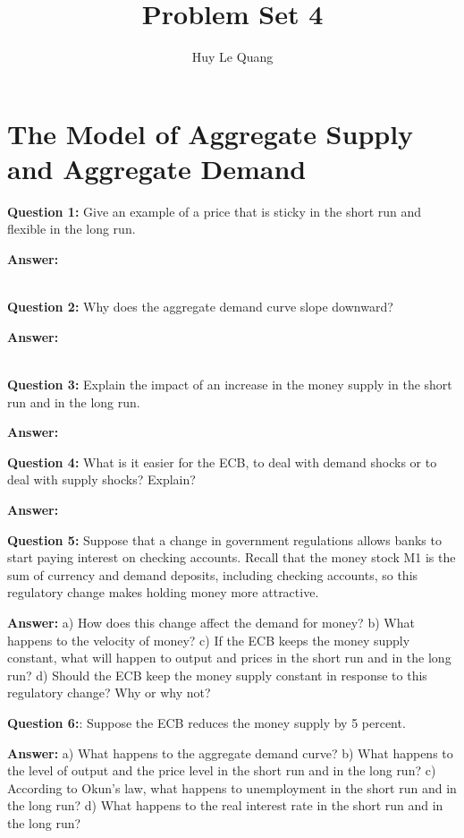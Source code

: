 \documentclass[a4paper, 11pt]{article}
\title{Problem Set 4}
\author{Huy Le Quang}
\begin{document}
\maketitle

\section {The Model of Aggregate Supply and Aggregate Demand}

\textbf{Question 1:} Give an example of a price that is sticky in the short run and flexible in the long run.

\textbf{Answer:} 

 \\

\textbf{Question 2:} Why does the aggregate demand curve slope downward?

\textbf{Answer:} 

 \\

\textbf{Question 3:} Explain the impact of an increase in the money supply in the short run and in the long run.

\textbf{Answer:}




\textbf{Question 4:} What is it easier for the ECB, to deal with demand shocks or to deal with supply shocks? Explain?

\textbf{Answer:}



\textbf{Question 5:} Suppose that a change in government regulations allows banks to start paying interest on checking accounts. Recall that the money stock M1 is the sum of currency and demand deposits, including checking accounts, so this regulatory change makes holding money more attractive.

\textbf{Answer:}
a) How does this change affect the demand for money?
b) What happens to the velocity of money?
c) If the ECB keeps the money supply constant, what will happen to output and prices in the short run and in the long run?
d) Should the ECB keep the money supply constant in response to this regulatory change? Why or why not?

\textbf{Question 6:}: Suppose the ECB reduces the money supply by 5 percent.

\textbf{Answer:} 
a) What happens to the aggregate demand curve?
b) What happens to the level of output and the price level in the short run and in the long run?
c) According to Okun’s law, what happens to unemployment in the short run and in the long run?
d) What happens to the real interest rate in the short run and in the long run?
\\
\end{document}
